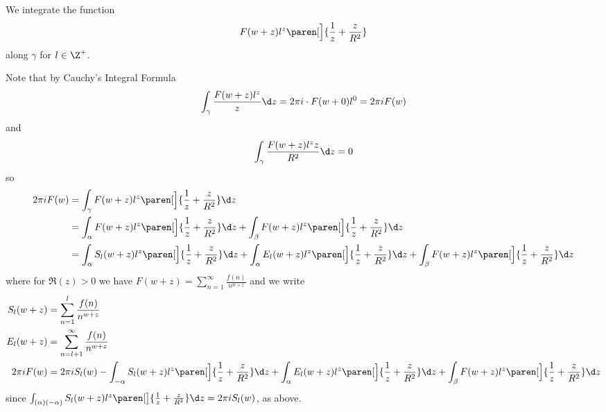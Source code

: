We integrate the function
\[ F(w+z) l^z \paren[\Big]{\frac1z+\frac z{R^2}} \]
along $\gamma$ for $l\in\Z^+$.

Note that by Cauchy's Integral Formula
\[ \int_\gamma \frac{F(w+z)l^z}{z} \d z = 2\pi i \cdot F(w+0)l^0 = 2\pi i F(w) \]
and
\[ \int_\gamma \frac{F(w+z)l^z z}{R^2}\d z = 0 \]
so
\begin{align*}
2\pi i F(w) &= \int_\gamma F(w+z)l^z\paren[\Big]{\frac1z+\frac z{R^2}}\d z \\
&= \int_\alpha F(w+z)l^z\paren[\Big]{\frac1z+\frac z{R^2}}\d z + \int_\beta F(w+z)l^z\paren[\Big]{\frac1z+\frac z{R^2}}\d z \\
&= \int_\alpha S_l(w+z)l^z\paren[\Big]{\frac1z+\frac z{R^2}}\d z + \int_\alpha E_l(w+z)l^z\paren[\Big]{\frac1z+\frac z{R^2}}\d z + \int_\beta F(w+z)l^z\paren[\Big]{\frac1z+\frac z{R^2}}\d z
\end{align*}
where for $\Re(z)>0$ we have $F(w+z)=\sum_{n=1}^\infty\frac{f(n)}{n^{w+z}}$ and we write
\begin{align*}
S_l(w+z) &= \sum_{n=1}^l \frac{f(n)}{n^{w+z}} \\
E_l(w+z) &= \sum_{n=l+1}^\infty \frac{f(n)}{n^{w+z}} \\
2\pi i F(w) &= 2\pi i S_l(w) - \int_{-\alpha} S_l(w+z) l^z \paren[\Big]{\frac1z+\frac z{R^2}}\d z + \int_\alpha E_l(w+z)l^z\paren[\Big]{\frac1z+\frac z{R^2}}\d z + \int_\beta F(w+z)l^z\paren[\Big]{\frac1z+\frac z{R^2}}\d z
\end{align*}
since $\int_{(\alpha)(-\alpha)}S_l(w+z)l^z\paren[\big]{\frac1z+\frac z{R^2}}\d z=2\pi iS_l(w)$, as above.

